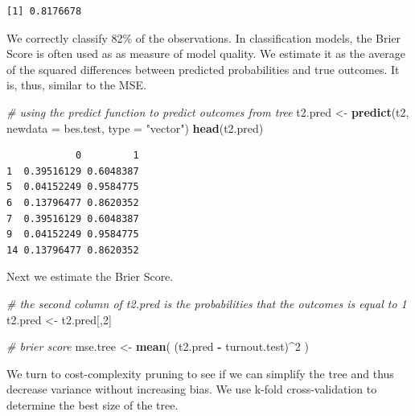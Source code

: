 \documentclass[]{article}
\newenvironment{Shaded}{\begin{snugshade}}{\end{snugshade}}
\newcommand{\CommentTok}[1]{\textcolor[rgb]{0.56,0.35,0.01}{\textit{#1}}}
\newcommand{\DataTypeTok}[1]{\textcolor[rgb]{0.13,0.29,0.53}{#1}}
\newcommand{\DecValTok}[1]{\textcolor[rgb]{0.00,0.00,0.81}{#1}}
\newcommand{\KeywordTok}[1]{\textcolor[rgb]{0.13,0.29,0.53}{\textbf{#1}}}
\newcommand{\NormalTok}[1]{#1}
\newcommand{\OperatorTok}[1]{\textcolor[rgb]{0.81,0.36,0.00}{\textbf{#1}}}
\newcommand{\StringTok}[1]{\textcolor[rgb]{0.31,0.60,0.02}{#1}}
\begin{document}
\begin{verbatim}
[1] 0.8176678
\end{verbatim}

We correctly classify 82\% of the observations. In classification models, the Brier Score is often used as as measure of model quality. We estimate it as the average of the squared differences between predicted probabilities and true outcomes. It is, thus, similar to the MSE.

\begin{Shaded}
\begin{Highlighting}[]
\CommentTok{# using the predict function to predict outcomes from tree}
\NormalTok{t2.pred <-}\StringTok{ }\KeywordTok{predict}\NormalTok{(t2, }\DataTypeTok{newdata =}\NormalTok{ bes.test, }\DataTypeTok{type =} \StringTok{"vector"}\NormalTok{)}
\KeywordTok{head}\NormalTok{(t2.pred)}
\end{Highlighting}
\end{Shaded}

\begin{verbatim}
            0         1
1  0.39516129 0.6048387
5  0.04152249 0.9584775
6  0.13796477 0.8620352
7  0.39516129 0.6048387
9  0.04152249 0.9584775
14 0.13796477 0.8620352
\end{verbatim}

Next we estimate the Brier Score.

\begin{Shaded}
\begin{Highlighting}[]
\CommentTok{# the second column of t2.pred is the probabilities that the outcomes is equal to 1}
\NormalTok{t2.pred <-}\StringTok{ }\NormalTok{t2.pred[,}\DecValTok{2}\NormalTok{]}

\CommentTok{# brier score}
\NormalTok{mse.tree <-}\StringTok{ }\KeywordTok{mean}\NormalTok{( (t2.pred }\OperatorTok{-}\StringTok{ }\NormalTok{turnout.test)}\OperatorTok{^}\DecValTok{2}\NormalTok{ )}
\end{Highlighting}
\end{Shaded}

We turn to cost-complexity pruning to see if we can simplify the tree and thus decrease variance without increasing bias. We use k-fold cross-validation to determine the best size of the tree.

\begin{Shaded}
\end{Shaded}
\end{document}
